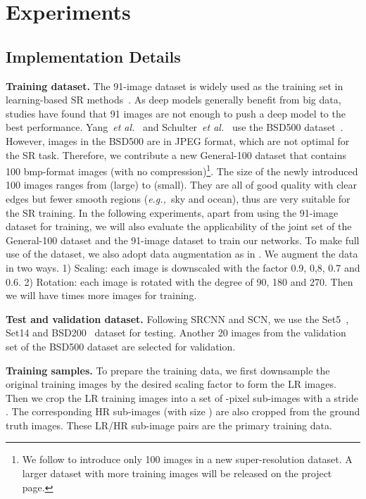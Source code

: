 \documentclass[runningheads]{llncs}
\newcommand{\etal}{\emph{et al.}}
\newcommand{\eg}{\emph{e.g.,}}
\begin{document}
\section{Experiments}

\subsection{Implementation Details}
\noindent
\textbf{Training dataset.} The 91-image dataset is widely used as the training set in learning-based SR methods~\cite{Yang2010a,Timofte2014,Dong2014}.
As deep models generally benefit from big data, studies have found that 91 images are not enough to push a deep model to the best performance. Yang~\etal~\cite{Yang2014} and Schulter~\etal~\cite{Schulter2015} use the BSD500 dataset~\cite{martin2001database}. However, images in the BSD500 are in JPEG format, which are not optimal for the SR task.
Therefore, we contribute a new General-100 dataset that contains 100 bmp-format images (with no compression)\footnote{We follow \cite{Huang2015} to introduce only 100 images in a new super-resolution dataset. A larger dataset with more training images will be released on the project page.}. The size of the newly introduced 100 images ranges from  (large) to  (small). They are all of good quality with clear edges but fewer smooth regions (\eg~sky and ocean), thus are very suitable for the SR training. In the following experiments, apart from using the 91-image dataset for training, we will also evaluate the applicability of the joint set of the General-100 dataset and the 91-image dataset to train our networks.
To make full use of the dataset, we also adopt data augmentation as in \cite{Wang2015}. We augment the data in two ways. 1) Scaling: each image is downscaled with the factor 0.9, 0,8, 0.7 and 0.6. 2) Rotation: each image is rotated with the degree of 90, 180 and 270. Then we will have  times more images for training.

\noindent
\textbf{Test and validation dataset.} Following SRCNN and SCN, we use the Set5~\cite{Bevilacqua2012}, Set14 \cite{Zeyde2012} and BSD200~\cite{martin2001database} dataset for testing. Another 20 images from the validation set of the BSD500 dataset are selected for validation.


\noindent
\textbf{Training samples.} To prepare the training data, we first downsample the original training images by the desired scaling factor  to form the LR images. Then we crop the LR training images into a set of -pixel sub-images with a stride . The corresponding HR sub-images (with size ) are also cropped from the ground truth images. These LR/HR sub-image pairs are the primary training data.
\end{document}
